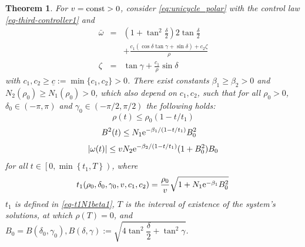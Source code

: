 \documentclass[letterpaper, 10 pt, conference]{ieeeconf}  %
\newtheorem{theorem}{Theorem}
\begin{document}
\begin{theorem}%
\label{thm:Dubins-FT-stabilize3}
For $v=\mbox{\rm const}>0$, consider \eqref{eq:unicycle_polar}
with the control law \eqref{eq-third-controller1} and 
\begin{subequations}
\label{eq-third-controller}
\begin{eqnarray}
\label{eq-third-controller2}
\bar\omega &=& \left(1+\tan^2\frac{\delta}{2}\right)2\tan\frac{\delta}{2} \nonumber\\
&& +\frac{c_1(\cos\delta\tan\gamma+\sin\delta) +c_2\zeta}{\rho}
\\
\label{eq-third-controller3}
\zeta &=& \tan\gamma+\frac{c_1}{\rho}\sin\delta\,
\end{eqnarray}
\end{subequations}
with $c_1,c_2 \geq \underline c :=\min\{c_1,c_2\} > 0$. There exist 
constants $\beta_1\geq \beta_2 >0$ and $N_2(\rho_0)\geq N_1(\rho_0) >0$, which also depend on $c_1,c_2$, 
such that for all $\rho_0>0$, $\delta_0\in(-\pi,\pi)$ and $\gamma_0\in(-\pi/2,\pi/2)$ the following holds:
\begin{equation}
\label{eq2-rho-bound3}
\rho(t)\leq \rho_0(1-t/t_1)
\end{equation}
\begin{align}
\label{eq2-deltan-bound3}
B^2(t) \leq&\; 
N_1 {\rm e}^{-\beta_1/({1-t/t_1})}B^2_0
\end{align}
\begin{align}
\label{eq2-omega(t)-bound3}
|\omega(t)| \leq v 
N_2 {\rm e}^{-\beta_2/({1-t/t_1})}
(1+B_0^2) B_0 
\end{align}
for all $t\in\left[0, \min\left\{t_1,T\right\}\right)$, where 
\begin{equation}
t_1(\rho_0,\delta_0, \gamma_0, v,c_1,c_2) =\frac{\rho_0}{v}{\sqrt{1+N_1 {\rm e}^{-\beta_1}B_0^2}}\,
\end{equation}
$t_1$ is defined in \eqref{eq-t1N1beta1}, 
$T$ is the interval of existence of the system's solutions, at which $\rho(T)=0$, and $B_0=B(\delta_0,\gamma_0), B(\delta,\gamma) := \sqrt{4\tan^2\dfrac{\delta}{2} +\tan^2\gamma}$. 
\end{theorem}
\end{document}
